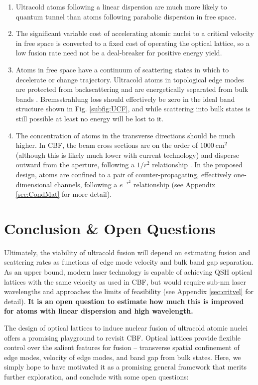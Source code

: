 \documentclass[onecolumn,
               superscriptaddress,
               floatfix,
               longbibliography, 
               showkeys,apl]{revtex4-2}
\begin{document}
\begin{enumerate}
  \item Ultracold atoms following a linear dispersion are much more likely to quantum tunnel than atoms following parabolic dispersion in free space.
  \item The significant variable cost of accelerating atomic nuclei to a critical velocity in free space is converted to a fixed cost of operating the optical lattice, so a low fusion rate need not be a deal-breaker for positive energy yield.
  \item  Atoms in free space have a continuum of scattering states in which to decelerate or change trajectory. Ultracold atoms in topological edge modes are protected from backscattering and are energetically separated from bulk bands \cite{RevModPhys.83.1057}. Bremsstrahlung loss should effectively be zero in the ideal band structure shown in Fig. \ref{subfig:UCF}, and while scattering into bulk states is still possible at least no energy will be lost to it. 
  \item The concentration of atoms in the transverse directions should be much higher. In CBF, the beam cross sections are on the order of $1000~\text{cm}^2$ (although this is likely much lower with current technology) and disperse outward from the aperture, following a $1/r^2$ relationship \cite{blewett197xcbf}. In the proposed design, atoms are confined to a pair of counter-propagating, effectively one-dimensional channels, following a $e^{-r^2}$ relationship (see Appendix \ref{sec:CondMat} for more detail).
\end{enumerate}


\section{Conclusion \& Open Questions}\label{sec:conclusion}

Ultimately, the viability of ultracold fusion will depend on estimating fusion and scattering rates as functions of edge mode velocity and bulk band gap separation. As an upper bound, modern laser technology is capable of achieving QSH optical lattices with the same velocity as used in CBF, but would require sub-nm laser wavelengths and approaches the limits of feasibility (see Appendix \ref{sec:critvel} for detail). \textbf{It is an open question to estimate how much this is improved for atoms with linear dispersion and high wavelength.}

The design of optical lattices to induce nuclear fusion of ultracold atomic nuclei offers a promising playground to revisit CBF. Optical lattices provide flexible control over the salient features for fusion -- transverse spatial confinement of edge modes, velocity of edge modes, and band gap from bulk states. Here, we simply hope to have motivated it as a promising general framework that merits further exploration, and conclude with some open questions:
\end{document}
